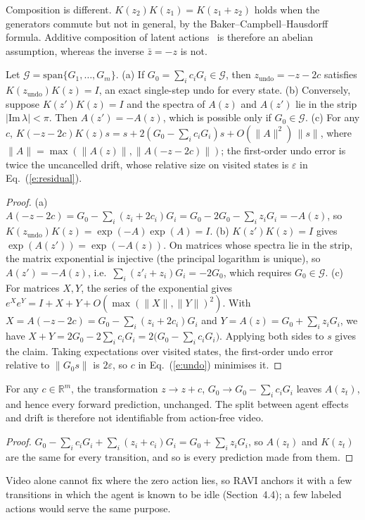 \documentclass{jcse}
\newcommand{\method}{RAVI}
\newcommand{\zb}{\bar{z}}
\newcommand{\zundo}{z_{\mathrm{undo}}}
\newcommand{\R}{\mathbb{R}}
\begin{document}
\begin{remark}
Composition is different.
$K(z_2)K(z_1)=K(z_1+z_2)$ holds when the generators commute but not in general, by the Baker--Campbell--Hausdorff formula.
Additive composition of latent actions~\cite{wei2026aclam} is therefore an abelian assumption, whereas the inverse $\zb=-z$ is not.
\end{remark}

\begin{proposition}
\label{p:undo}
Let $\mathcal{G}=\mathrm{span}\{G_1,\dots,G_m\}$.
(a) If $G_0=\sum_ic_iG_i\in\mathcal{G}$, then $\zundo=-z-2c$ satisfies $K(\zundo)K(z)=I$, an exact single-step undo for every state.
(b) Conversely, suppose $K(z')K(z)=I$ and the spectra of $A(z)$ and $A(z')$ lie in the strip $|\mathrm{Im}\,\lambda|<\pi$. Then $A(z')=-A(z)$, which is possible only if $G_0\in\mathcal{G}$.
(c) For any $c$, $K(-z-2c)K(z)s=s+2(G_0-\sum_ic_iG_i)s+O(\|A\|^2)\,\|s\|$, where $\|A\|=\max(\|A(z)\|,\|A(-z-2c)\|)$; the first-order undo error is twice the uncancelled drift, whose relative size on visited states is $\varepsilon$ in Eq.~(\ref{e:residual}).
\end{proposition}
\begin{proof}
(a) $A(-z-2c)=G_0-\sum_i(z_i+2c_i)G_i=G_0-2G_0-\sum_iz_iG_i=-A(z)$, so $K(\zundo)K(z)=\exp(-A)\exp(A)=I$.
(b) $K(z')K(z)=I$ gives $\exp(A(z'))=\exp(-A(z))$.
On matrices whose spectra lie in the strip, the matrix exponential is injective (the principal logarithm is unique), so $A(z')=-A(z)$, i.e.\ $\sum_i(z'_i+z_i)G_i=-2G_0$, which requires $G_0\in\mathcal{G}$.
(c) For matrices $X,Y$, the series of the exponential gives $e^Xe^Y=I+X+Y+O(\max(\|X\|,\|Y\|)^2)$.
With $X=A(-z-2c)=G_0-\sum_i(z_i+2c_i)G_i$ and $Y=A(z)=G_0+\sum_iz_iG_i$, we have $X+Y=2G_0-2\sum_ic_iG_i=2\big(G_0-\sum_ic_iG_i\big)$.
Applying both sides to $s$ gives the claim.
Taking expectations over visited states, the first-order undo error relative to $\|G_0s\|$ is $2\varepsilon$, so $c$ in Eq.~(\ref{e:undo}) minimises it.
\end{proof}

\begin{proposition}
\label{p:gauge}
For any $c\in\R^m$, the transformation $z\to z+c$, $G_0\to G_0-\sum_ic_iG_i$ leaves $A(z_t)$, and hence every forward prediction, unchanged.
The split between agent effects and drift is therefore not identifiable from action-free video.
\end{proposition}
\begin{proof}
$G_0-\sum_ic_iG_i+\sum_i(z_i+c_i)G_i=G_0+\sum_iz_iG_i$, so $A(z_t)$ and $K(z_t)$ are the same for every transition, and so is every prediction made from them.
\end{proof}
Video alone cannot fix where the zero action lies, so {\method} anchors it with a few transitions in which the agent is known to be idle (Section~4.4); a few labeled actions would serve the same purpose.
\end{document}
